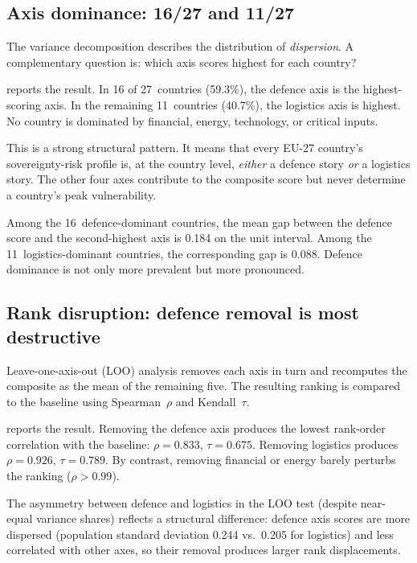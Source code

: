 \subsection{Axis dominance: 16/27 and 11/27}

The variance decomposition describes the distribution of
\emph{dispersion}.  A complementary question is: which axis scores
highest for each country?

 reports the result.  In 16 of
27~countries (59.3\%), the defence axis is the highest-scoring axis.
In the remaining 11~countries (40.7\%), the logistics axis is
highest.  No country is dominated by financial, energy, technology,
or critical inputs.

This is a strong structural pattern.  It means that every EU-27
country's sovereignty-risk profile is, at the country level,
\emph{either} a defence story \emph{or} a logistics story.  The
other four axes contribute to the composite score but never determine
a country's peak vulnerability.

Among the 16~defence-dominant countries, the mean gap between the
defence score and the second-highest axis is 0.184 on the unit
interval.  Among the 11~logistics-dominant countries, the
corresponding gap is 0.088.  Defence dominance is not only more
prevalent but more pronounced.

\subsection{Rank disruption: defence removal is most destructive}

Leave-one-axis-out (LOO) analysis removes each axis in turn and
recomputes the composite as the mean of the remaining five.  The
resulting ranking is compared to the baseline using Spearman~$\rho$
and Kendall~$\tau$.

 reports the result.  Removing the defence
axis produces the lowest rank-order correlation with the baseline:
$\rho = 0.833$, $\tau = 0.675$.  Removing logistics produces
$\rho = 0.926$, $\tau = 0.789$.  By contrast, removing financial or
energy barely perturbs the ranking ($\rho > 0.99$).

The asymmetry between defence and logistics in the LOO test
(despite near-equal variance shares) reflects a structural
difference: defence axis scores are more dispersed (population
standard deviation 0.244 vs.\ 0.205 for logistics) and less
correlated with other axes, so their removal produces larger rank
displacements.

